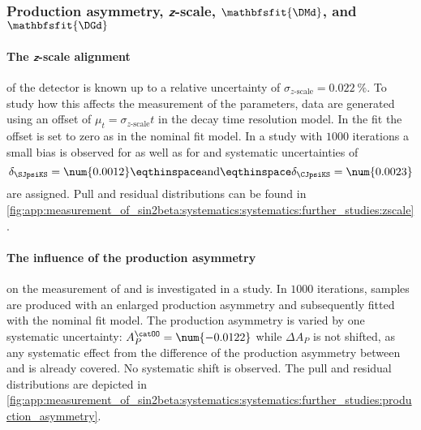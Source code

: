 \subsubsection[Production asymmetry, $z$-scale, \DMd, and \DGd]{Production asymmetry, $\mathbfsfit{z}$-scale, $\mathbfsfit{\DMd}$, and $\mathbfsfit{\DGd}$}
\label{sec:measurement_of_sin2beta:systematics:systematics:further_studies}

\paragraph{The $\mathbfsfit{z}$-scale alignment} of the \LHCb detector is known
up to a relative uncertainty of $\sigma_\text{$z$-scale} =
\SI{0.022}{\percent}$. To study how this affects the measurement of the \CP
parameters, data are generated using an offset of $\mu_{t} =
\sigma_\text{$z$-scale} t$ in the decay time resolution model. In the fit the
offset is set to zero as in the nominal fit model. In a \ToyMC study with
$\num{1000}$ iterations a small bias is observed for \SJpsiKS as well as for
\CJpsiKS and systematic uncertainties of
%
\begin{equation}
  \delta_{\SJpsiKS} = \num{0.0012}\eqthinspace\text{and}\eqthinspace\delta_{\CJpsiKS} = \num{0.0023}
\end{equation}
%
are assigned. Pull and residual distributions can be found in
\cref{fig:app:measurement_of_sin2beta:systematics:systematics:further_studies:zscale}.

\paragraph{The influence of the production asymmetry} on the measurement of
\SJpsiKS and \CJpsiKS is investigated in a \ToyMC study. In $\num{1000}$
iterations, samples are produced with an enlarged production asymmetry and
subsequently fitted with the nominal fit model. The production asymmetry is
varied by one systematic uncertainty: $A_P^{\catOO} = \num{-0.0122}$ while
$\Delta A_P$ is not shifted, as any systematic effect from the difference of the
production asymmetry between \catOO and \catOT is already covered. No systematic
shift is observed. The pull and residual distributions are depicted in 
\cref{fig:app:measurement_of_sin2beta:systematics:systematics:further_studies:production_asymmetry}.

